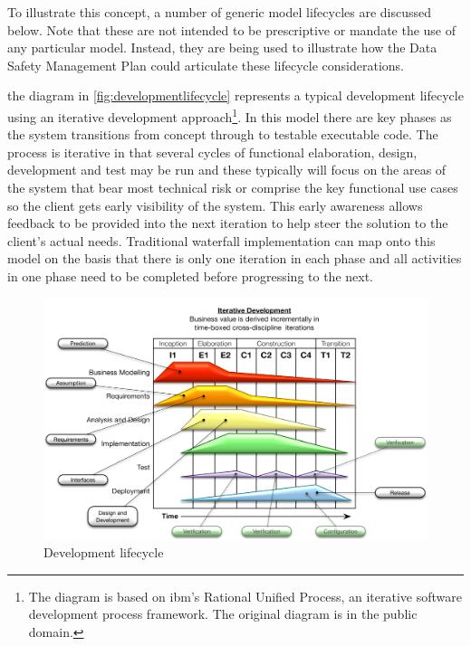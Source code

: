 To illustrate this concept, a number of generic model lifecycles are discussed below. Note that these are not intended to be prescriptive or mandate the use of any particular model. Instead, they are being used to illustrate how the Data Safety Management Plan could articulate these lifecycle considerations.

 the diagram in \autoref{fig:developmentlifecycle} represents a typical development lifecycle using an iterative development approach\footnote{The diagram is based on \gls{ibm}'s Rational Unified Process, an iterative software development process framework. The original diagram is in the public domain.}. In this model there are key phases as the system transitions from concept through to testable executable code. The process is iterative in that several cycles of functional elaboration, design, development and test may be run and these typically will focus on the areas of the system that bear most technical risk or comprise the key functional use cases so the client gets early visibility of the system. This early awareness allows feedback to be provided into the next iteration to help steer the solution to the client's actual needs. Traditional waterfall implementation can map onto this model on the basis that there is only one iteration in each phase and all activities in one phase need to be completed before progressing to the next.

\begin{figure}[htbp]
  \centering
  \includegraphics[width=\textwidth]{images/developmentlifecycleflat}
  \caption{Development lifecycle}
  \label{fig:developmentlifecycle}
\end{figure}

